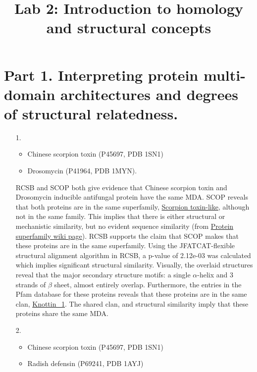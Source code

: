 \documentclass[11pt]{article}
\title{Lab 2: Introduction to homology and structural concepts}
\author{\Name}%
\begin{document}
\maketitle

\section*{Part 1.  Interpreting protein multi-domain 
  architectures and degrees of structural relatedness.}

\begin{itemize}
\item[1.]
  \begin{itemize}
  \item Chinese scorpion toxin (P45697, PDB 1SN1)
  \item Drosomycin (P41964, PDB 1MYN).  
  \end{itemize}
  
  RCSB and SCOP both give evidence that Chinese scorpion toxin and 
  Drosomycin inducible antifungal protein
  have the same MDA. SCOP reveals that both proteins are 
  in the same superfamily, \href{http://scop.mrc-lmb.cam.ac.uk/scop/data/scop.b.h.c.h.html}{Scorpion toxin-like}, 
  although
  not in the same family. This implies that there is either structural or mechanistic
  similarity, but no evident sequence similarity 
  (from \href{http://en.wikipedia.org/wiki/Protein_superfamily}{Protein superfamily wiki page}).
  RCSB supports the claim that SCOP makes that these proteins are in the same superfamily. 
  Using the JFATCAT-flexible structural alignment algorithm in RCSB, a p-value of 2.12e-03 was
  calculated which implies significant structural similarity. Visually, the overlaid structures
  reveal that the major secondary structure motifs: a single $\alpha$-helix and 3 strands of $\beta$ sheet,
  almost entirely overlap.
  Furthermore, the entries in
  the Pfam database for these proteins reveals that these proteins are in the same clan, 
  \href{http://pfam.sanger.ac.uk/clan/Knottin_1}{Knottin\_1}. The shared clan, and structural
  similarity imply that these proteins share the same MDA.


\item[2.]
  \begin{itemize}
  \item Chinese scorpion toxin (P45697, PDB 1SN1)
  \item Radish defensin (P69241, PDB 1AYJ)
  \end{itemize}


\end{itemize}
\end{document}
